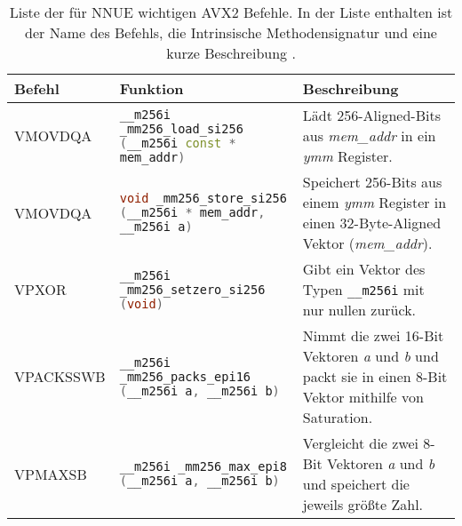 \begin{table}[h]
  \caption{Liste der für \ac{NNUE} wichtigen \ac{AVX2} Befehle. In der Liste enthalten ist der Name des Befehls, die Intrinsische Methodensignatur und eine kurze Beschreibung \cite{intelIntrinsics}.}
  \label{table:nnueInstructions}
  \renewcommand{\arraystretch}{1.2}
  \centering
  \sffamily
  \begin{footnotesize}
    \begin{tabularx}{\textwidth}{l X X}
      \toprule
      \textbf{Befehl} & \textbf{Funktion}                                                                                                                                                                                    & \textbf{Beschreibung} \\
      \midrule
      VMOVDQA         & \lstinline[language=C++]{__m256i _mm256_load_si256 (__m256i const * mem_addr)} & Lädt 256-Aligned-Bits aus \emph{mem\_addr} in ein \emph{ymm} Register.                                                                                                                                                                 \\
      VMOVDQA         & \lstinline[language=C++]{void _mm256_store_si256 (__m256i * mem_addr, __m256i a)} & Speichert 256-Bits aus einem \emph{ymm} Register in einen 32-Byte-Aligned Vektor (\emph{mem\_addr}).                                                                                                                                      \\
      VPXOR           & \lstinline[language=C++]{__m256i _mm256_setzero_si256 (void)} & Gibt ein Vektor des Typen \lstinline[language=C++]{__m256i} mit nur nullen zurück.                                                                                                                                                                        \\
      VPACKSSWB       & \lstinline[language=C++]{__m256i _mm256_packs_epi16 (__m256i a, __m256i b)} & Nimmt die zwei 16-Bit Vektoren \emph{a} und \emph{b} und packt sie in einen 8-Bit Vektor mithilfe von Saturation.                                                                                                                           \\
      VPMAXSB         & \lstinline[language=C++]{__m256i _mm256_max_epi8 (__m256i a, __m256i b)}    & Vergleicht die zwei 8-Bit Vektoren \emph{a} und \emph{b} und speichert die jeweils größte Zahl.                                                                                                                                                 \\

\end{tabularx}
\end{footnotesize}
\end{table}

